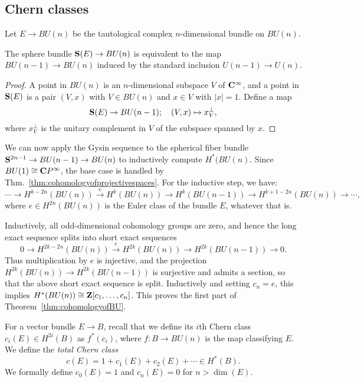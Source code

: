 \documentclass[a4paper,openany]{scrbook}
\begin{document}
\subsection{Chern classes}

Let $E \to BU(n)$ be the tautological complex $n$-dimensional bundle on $BU(n)$.

\begin{lemma}
The sphere bundle $\S(E) \to BU(n)$ is equivalent to the map $BU(n-1) \to BU(n)$ induced by the standard inclusion $U(n-1) \to U(n)$.
\end{lemma}
\begin{proof}
A point in $BU(n)$ is an $n$-dimensional subspace $V$ of $\CC^\infty$, and a point in $\S(E)$ is a pair $(V,x)$ with $V \in BU(n)$ and $x \in V$ with $|x| = 1$. Define a map
\[
\S(E) \to BU(n-1); \quad (V,x) \mapsto x^\perp_V,
\]
where $x^\perp_V$ is the unitary complement in $V$ of the subspace spanned by $x$.
\end{proof}

We can now apply the Gysin sequence to the spherical fiber bundle $\S^{2n-1} \to BU(n-1) \to BU(n)$ to inductively compute $H^*(BU(n)$. Since $BU(1)\cong \CP^\infty$, the base case is handled by Thm.~\ref{thm:cohomologyofprojectivespaces}.
 For the inductive step, we have:
\[
\cdots \to H^{k-2n}(BU(n)) \xrightarrow{e} H^k(BU(n)) \to H^k(BU(n-1)) \to H^{k+1-2n}(BU(n)) \to \cdots,
\]
where $e \in H^{2n}(BU(n))$ is the Euler class of the bundle $E$, whatever that is.

Inductively, all odd-dimensional cohomology groups are zero, and hence the long exact sequence splits into short exact sequences
\[
0 \to H^{2k-2n}(BU(n)) \xrightarrow{e} H^{2k}(BU(n)) \to H^{2k}(BU(n-1)) \to 0.
\]
Thus multiplication by $e$ is injective, and the projection $H^{2k}(BU(n)) \to H^{2k}(BU(n-1))$ is surjective and admits a section, so that the above short exact sequence is split. Inductively and setting $c_n=e$, this implies $H^*(BU(n)) \cong \Z[c_1,\dots,c_n]$. This proves the first part of Theorem~\ref{thm:cohomologyofBU}.

For a vector bundle $E \to B$, recall that we define its $i$th Chern class $c_i(E) \in H^{2i}(B)$ as $f^*(c_i)$, where $f\colon B \to BU(n)$ is the map classifying $E$. We define the \emph{total Chern class}
\[
c(E) = 1 + c_1(E) + c_2(E) + \cdots \in H^*(B).
\]
We formally define $c_0(E)=1$ and $c_n(E)=0$ for $n > \dim(E)$.
\end{document}

